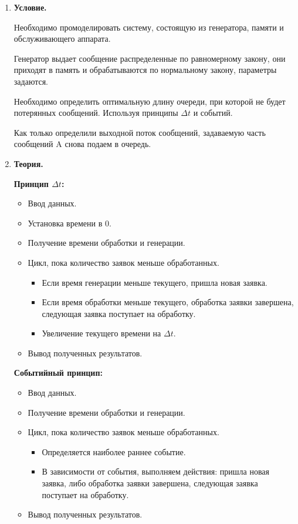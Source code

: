\documentclass[a4paper,14pt]{extreport} %
\begin{document}
\begin{enumerate}

\item \textbf{Условие. }

Необходимо промоделировать систему, состоящую из генератора, памяти и обслуживающего аппарата. 

Генератор выдает сообщение распределенные по равномерному закону, они приходят в память и обрабатываются по нормальному закону, параметры задаются. 

Необходимо определить оптимальную длину очереди, при которой не будет потерянных сообщений. Используя принципы $\Delta t$ и событий. 

Как только определили выходной поток сообщений, задаваемую часть сообщений A снова подаем в очередь.

\item \textbf{Теория. }

\textbf{Принцип $\Delta t$:}

\begin{itemize}
\item Ввод данных. 
\item Установка времени в 0. 
\item Получение времени обработки и генерации.  
\item Цикл, пока количество заявок меньше обработанных. 
\begin{itemize}
\item Если время генерации меньше текущего, пришла новая заявка. 
\item Если время обработки меньше текущего, обработка заявки завершена, следующая заявка поступает на обработку. 
\item Увеличение текущего времени на $\Delta t$. 
\end{itemize}
\item Вывод полученных результатов. 
\end{itemize}

\textbf{Событийный принцип:}

\begin{itemize}
\item Ввод данных. 
\item Получение времени обработки и генерации.  
\item Цикл, пока количество заявок меньше обработанных. 
\begin{itemize}
\item Определяется наиболее раннее событие. 
\item В зависимости от события, выполняем действия: пришла новая заявка, либо обработка заявки завершена, следующая заявка поступает на обработку. 
\end{itemize}
\item Вывод полученных результатов. 
\end{itemize}


\end{enumerate}
\end{document}
